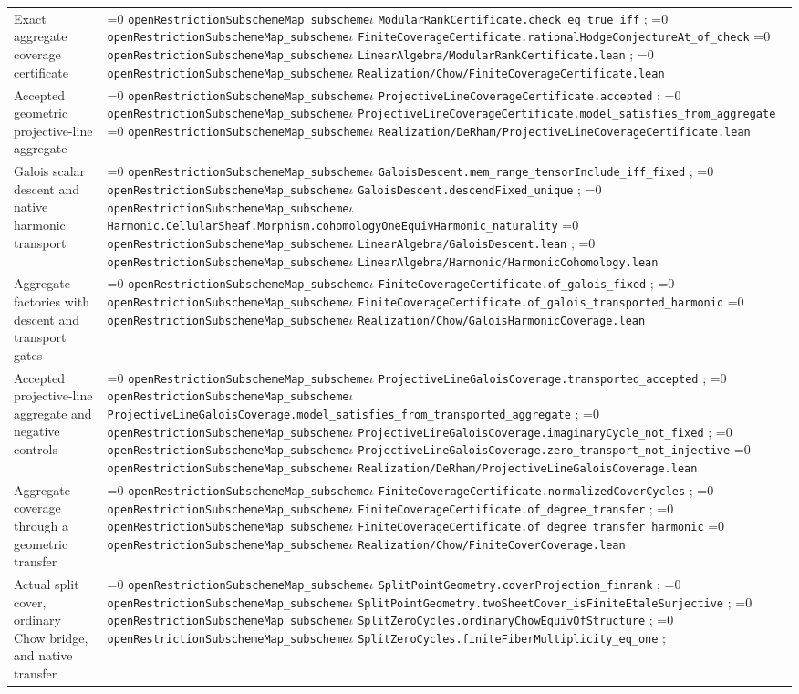\documentclass[11pt]{article}
\theoremstyle{definition}
\theoremstyle{remark}
\newcommand{\leanpath}[1]{%
  \ifnum\pdfstrcmp{\detokenize{#1}}%
      {\detokenize{openRestrictionSubschemeMap_subschemeι}}=0
    \texttt{\nolinkurl{openRestrictionSubschemeMap_subscheme}}\ensuremath{\iota}%
  \else
    \texttt{\nolinkurl{#1}}%
  \fi}
\begin{document}
\begin{longtable}{@{}>{\raggedright\arraybackslash}p{}
                >{\raggedright\arraybackslash}p{}@{}}
Exact aggregate coverage certificate &
\leanpath{ModularRankCertificate.check_eq_true_iff};
\leanpath{FiniteCoverageCertificate.rationalHodgeConjectureAt_of_check}\newline
\leanpath{LinearAlgebra/ModularRankCertificate.lean};
\leanpath{Realization/Chow/FiniteCoverageCertificate.lean}\\
Accepted geometric projective-line aggregate &
\leanpath{ProjectiveLineCoverageCertificate.accepted};
\leanpath{ProjectiveLineCoverageCertificate.model_satisfies_from_aggregate}\newline
\leanpath{Realization/DeRham/ProjectiveLineCoverageCertificate.lean}\\
Galois scalar descent and native harmonic transport &
\leanpath{GaloisDescent.mem_range_tensorInclude_iff_fixed};
\leanpath{GaloisDescent.descendFixed_unique};
\leanpath{Harmonic.CellularSheaf.Morphism.cohomologyOneEquivHarmonic_naturality}\newline
\leanpath{LinearAlgebra/GaloisDescent.lean};
\leanpath{LinearAlgebra/Harmonic/HarmonicCohomology.lean}\\
Aggregate factories with descent and transport gates &
\leanpath{FiniteCoverageCertificate.of_galois_fixed};
\leanpath{FiniteCoverageCertificate.of_galois_transported_harmonic}\newline
\leanpath{Realization/Chow/GaloisHarmonicCoverage.lean}\\
Accepted projective-line aggregate and negative controls &
\leanpath{ProjectiveLineGaloisCoverage.transported_accepted};
\leanpath{ProjectiveLineGaloisCoverage.model_satisfies_from_transported_aggregate};
\leanpath{ProjectiveLineGaloisCoverage.imaginaryCycle_not_fixed};
\leanpath{ProjectiveLineGaloisCoverage.zero_transport_not_injective}\newline
\leanpath{Realization/DeRham/ProjectiveLineGaloisCoverage.lean}\\
Aggregate coverage through a geometric transfer &
\leanpath{FiniteCoverageCertificate.normalizedCoverCycles};
\leanpath{FiniteCoverageCertificate.of_degree_transfer};
\leanpath{FiniteCoverageCertificate.of_degree_transfer_harmonic}\newline
\leanpath{Realization/Chow/FiniteCoverCoverage.lean}\\
Actual split cover, ordinary Chow bridge, and native transfer &
\leanpath{SplitPointGeometry.coverProjection_finrank};
\leanpath{SplitPointGeometry.twoSheetCover_isFiniteEtaleSurjective};
\leanpath{SplitZeroCycles.ordinaryChowEquivOfStructure};
\leanpath{SplitZeroCycles.finiteFiberMultiplicity_eq_one};

\end{longtable}
\end{document}
